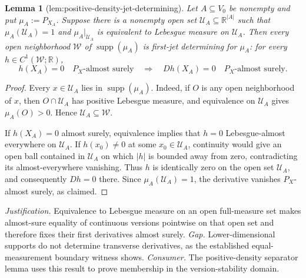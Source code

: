 \documentclass{article}
\newtheorem{lemma}{Lemma}
\begin{document}
\begin{lemma}[lem:positive-density-jet-determining]\label{lem:positive-density-jet-determining}
Let \(A\subseteq V_0\) be nonempty and put \(\mu_A:=P_{X_A}\).  Suppose there is a nonempty open set \(\mathcal U_A\subseteq\mathbb R^{|A|}\) such that \(\mu_A(\mathcal U_A)=1\) and \(\mu_A|_{\mathcal U_A}\) is equivalent to Lebesgue measure on \(\mathcal U_A\).  Then every open neighborhood \(\mathcal W\) of \(\operatorname{supp}(\mu_A)\) is first-jet determining for \(\mu_A\): for every \(h\in C^1(\mathcal W;\mathbb R)\),
\[
 h(X_A)=0\quad P_X\text{-almost surely}
 \quad\Longrightarrow\quad
 Dh(X_A)=0\quad P_X\text{-almost surely}.
\]
\end{lemma}
\begin{proof}
Every \(x\in\mathcal U_A\) lies in \(\operatorname{supp}(\mu_A)\).  Indeed, if \(O\) is any open neighborhood of \(x\), then \(O\cap\mathcal U_A\) has positive Lebesgue measure, and equivalence on \(\mathcal U_A\) gives \(\mu_A(O)>0\).  Hence \(\mathcal U_A\subseteq\mathcal W\).

If \(h(X_A)=0\) almost surely, equivalence implies that \(h=0\) Lebesgue-almost everywhere on \(\mathcal U_A\).  If \(h(x_0)\neq0\) at some \(x_0\in\mathcal U_A\), continuity would give an open ball contained in \(\mathcal U_A\) on which \(|h|\) is bounded away from zero, contradicting its almost-everywhere vanishing.  Thus \(h\) is identically zero on the open set \(\mathcal U_A\), and consequently \(Dh=0\) there.  Since \(\mu_A(\mathcal U_A)=1\), the derivative vanishes \(P_X\)-almost surely, as claimed.
\end{proof}
\par\smallskip\noindent \textit{Justification.} Equivalence to Lebesgue measure on an open full-measure set makes almost-sure equality of continuous versions pointwise on that open set and therefore fixes their first derivatives almost surely. \textit{Gap.} Lower-dimensional supports do not determine transverse derivatives, as the established equal-measurement boundary witness shows. \textit{Consumer.} The positive-density separator lemma uses this result to prove membership in the version-stability domain.
\end{document}
